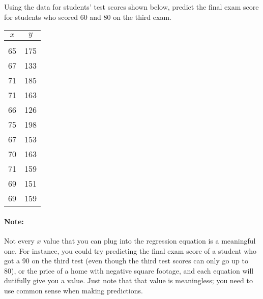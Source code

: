 \begin{try}
Using the data for students' test scores shown below, predict the final exam score for students who scored 60 and 80 on the third exam.
\begin{center}
\begin{tabular}{c c}
$x$ & $y$\\
\hline
\\
65 & 175\\
67 & 133\\
71 & 185\\
71 & 163\\
66 & 126\\
75 & 198\\
67 & 153\\
70 & 163\\
71 & 159\\
69 & 151\\
69 & 159
\end{tabular}
\end{center}
\end{try}

\paragraph{Note:} Not every $x$ value that you can plug into the regression equation is a meaningful one.  For instance, you could try predicting the final exam score of a student who got a 90 on the third test (even though the third test scores can only go up to 80), or the price of a home with negative square footage, and each equation will dutifully give you a value.  Just note that that value is meaningless; you need to use common sense when making predictions.

